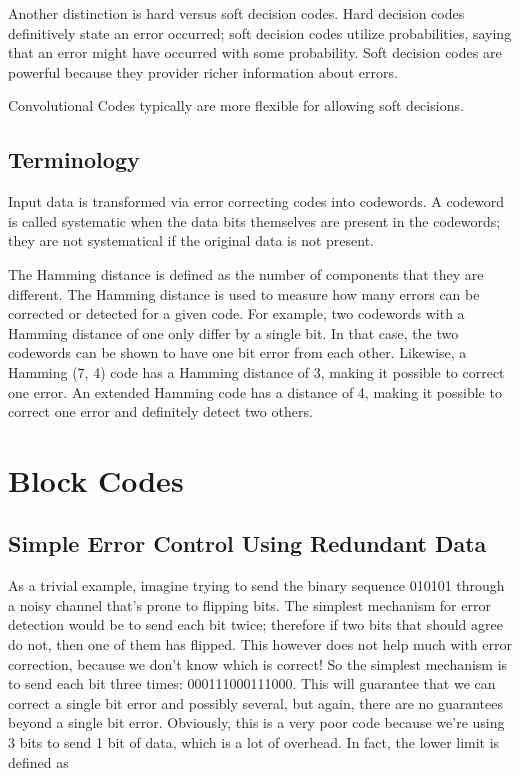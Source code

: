 \documentclass[12pt]{article}
\begin{document}
Another distinction is hard versus soft decision codes. Hard decision codes definitively state an error occurred; soft decision codes utilize probabilities, saying that an error might have occurred with some probability. Soft decision codes are powerful because they provider richer information about errors. \cite{mitvit}

Convolutional Codes typically are more flexible for allowing soft decisions.\cite{tanenbaum}

\subsection{Terminology}

Input data is transformed via error correcting codes into codewords. A codeword is called systematic when the data bits themselves are present in the codewords; they are not systematical if the original data is not present. 

The Hamming distance is defined as the number of components that they are different. The Hamming distance is used to measure how many errors can be corrected or detected for a given code. For example, two codewords with a Hamming distance of one only differ by a single bit. In that case, the two codewords can be shown to have one bit error from each other. Likewise, a Hamming (7, 4) code has a Hamming distance of 3, making it possible to correct one error. An extended Hamming code has a distance of 4, making it possible to correct one error and definitely detect two others. \cite{sphere}

\section{Block Codes}

\subsection{Simple Error Control Using Redundant Data}

As a trivial example, imagine trying to send the binary sequence 010101 through a noisy channel that's prone to flipping bits. The simplest mechanism for error detection would be to send each bit twice; therefore if two bits that should agree do not, then one of them has flipped. This however does not help much with error correction, because we don't know which is correct! So the simplest mechanism is to send each bit three times: 000111000111000. This will guarantee that we can correct a single bit error and possibly several, but again, there are no guarantees beyond a single bit error. Obviously, this is a very poor code because we're using 3 bits to send 1 bit of data, which is a lot of overhead. In fact, the lower limit is defined as 
\end{document}
